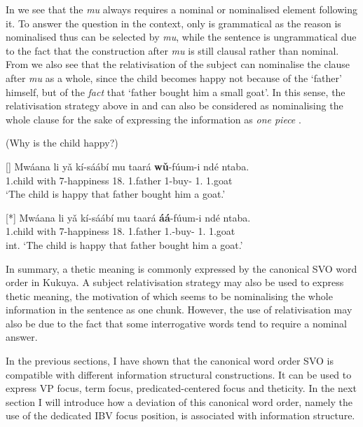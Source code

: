 \documentclass[output=paper,colorlinks,citecolor=brown,
]{langscibook}
\begin{document}
In  we see that the \textit{mu} always requires a nominal or nominalised element following it. To answer the question in the context, only  is grammatical as the reason is nominalised thus can be selected by \textit{mu}, while  the sentence is ungrammatical due to the fact that the construction after \textit{mu} is still clausal rather than nominal. From  we also see that the relativisation of the subject can nominalise the clause after \textit{mu} as a whole, since the child becomes happy not because of the `father' himself, but of the \textit{fact} that `father bought him a small goat'. In this sense, the relativisation strategy above in  and  can also be considered as nominalising the whole clause for the sake of expressing the information as \textit{one piece} \citep{Sasse1987}. 
\begin{exe} 
    \ex  (Why is the child happy?) \label{18}
    \begin{xlist}
\ex
[]{
\label{18a}
\gll
Mwáana li y\v{a} kí-sáábí mu taará \textbf{wǔ}-fúum-i ndé ntaba.\\
1.child \Cop{} with 7-happiness 18.\Loc{} 1.father 1\Rel{}-buy-\Pst{} 1.\Pro{} 1.goat\\
\trans ‘The child is happy that father bought him a goat.’
}

\ex
[*]{
\label{18b}
\gll
Mwáana li y\v{a} kí-sáábí mu taará \textbf{áá}-fúum-i ndé ntaba.\\
1.child \Cop{} with 7-happiness 18.\Loc{} 1.father 1\Sm{}.\Pst{}-buy-\Pst{} 1.\Pro{} 1.goat\\
\trans int. ‘The child is happy that father bought him a goat.’
}

    \end{xlist}
\end{exe}
In summary, a thetic meaning is commonly expressed by the canonical SVO word order in Kukuya. A subject relativisation strategy may also be used to express thetic meaning, the motivation of which seems to be nominalising the whole information in the sentence as one chunk. However, the use of relativisation may also be due to the fact that some interrogative words tend to require a nominal answer.

In the previous sections, I have shown that the canonical word order SVO is compatible with different information structural constructions. It can be used to express VP focus, term focus, predicated-centered focus and theticity. In the next section I will introduce how a deviation of this canonical word order, namely the use of the dedicated IBV focus position, is associated with information structure.
\end{document}
